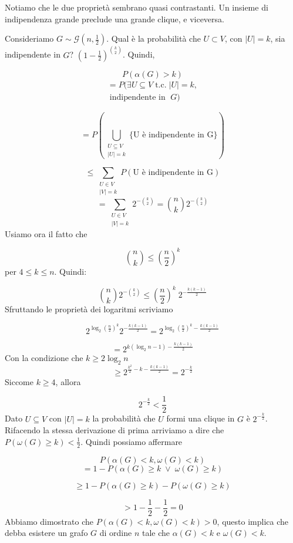 \documentclass[12pt]{report}
\begin{document}
\noindent
   Notiamo che le due proprietà sembrano quasi contrastanti. Un insieme di indipendenza grande preclude una grande clique, e viceversa.

\begin{dimo}
    Consideriamo $G \sim \mathscr{G}(n,\frac{1}{2})$. Qual è la probabilità che $U \subset V$, con $|U| = k$, sia indipendente in $G$? $(1 - \frac{1}{2})^{\binom{k}{2}}$. Quindi,

        
        $$P(\alpha(G) > k )$$
        \begin{multline*}
            = P(\exists U \subseteq V \; \text{t.c.} \;  |U| = k,\\\; \text{indipendente in }\; G)
        \end{multline*}

        $$= P(\bigcup_{\substack{U \subseteq V \\ |U| = k}} \{\text{U è indipendente in G}\}) $$

        $$\leq \sum_{\substack{U \in V \\ |V| = k}} P(\text{U è indipendente in G})$$
        $$= \sum_{\substack{U \in V \\ |V| = k}} 2^{-\binom{k}{2}} =  \binom{n}{k} 2^{-\binom{k}{2}}$$
        Usiamo ora il fatto che 

        $$\binom{n}{k} \leq (\frac{n}{2})^k$$
        per $4 \leq k \leq n$. Quindi:

        $$\binom{n}{k} 2^{-\binom{k}{2}} \leq (\frac{n}{2})^k \; 2^{-\frac{k(k-1)}{2}} $$
        Sfruttando le proprietà dei logaritmi scriviamo

        $$2^{\log_2{(\frac{n}{2})^k}}  2^{-\frac{k(k-1)}{2}} = 2^{\log_2{(\frac{n}{2})^k} - \frac{k(k-1)}{2} }$$

        $$= 2^{k(\log_2{n} - 1) - \frac{k(k-1)}{2}}$$
        Con la condizione che $k \geq 2\log_2{n}$
        $$\geq 2^{\frac{k^2}{2} - k - \frac{k(k-1)}{2}} = 2^{-\frac{k}{2}}$$
        Siccome $k \geq 4$, allora 

        $$2^{-\frac{k}{2}} < \frac{1}{2}$$
        Dato $U \subseteq V$ con $|U| = k$ la probabilità che $U$ formi una clique in $G$ è $2^{-\frac{k}{2}}$. Rifacendo la stessa derivazione di prima arriviamo a dire che $P(\omega(G) \geq k) < \frac{1}{2}$. Quindi possiamo affermare

        $$P(\alpha(G) < k, \omega(G) < k) $$
        $$= 1 - P(\alpha(G) \geq k \; \lor \; \omega(G) \geq k )$$

        $$\geq 1 - P(\alpha(G) \geq k) - P(\omega(G) \geq k)$$

        $$> 1 - \frac{1}{2} - \frac{1}{2} = 0$$
        Abbiamo dimostrato che  $P(\alpha(G) < k, \omega(G) < k) > 0$, questo implica che debba esistere un grafo $G$ di ordine $n$ tale che $\alpha(G) < k$ e $\omega(G) < k$.
\end{dimo}
\end{document}
